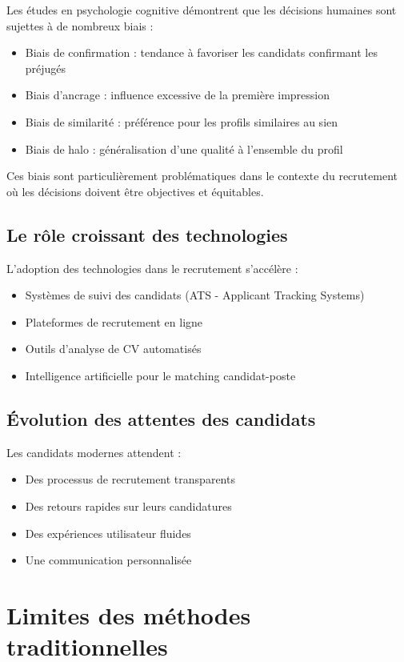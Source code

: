 \documentclass[12pt,a4paper]{report}
\begin{document}
Les études en psychologie cognitive démontrent que les décisions humaines sont sujettes à de nombreux biais :
\begin{itemize}
\item Biais de confirmation : tendance à favoriser les candidats confirmant les préjugés
\item Biais d'ancrage : influence excessive de la première impression
\item Biais de similarité : préférence pour les profils similaires au sien
\item Biais de halo : généralisation d'une qualité à l'ensemble du profil
\end{itemize}

Ces biais sont particulièrement problématiques dans le contexte du recrutement où les décisions doivent être objectives et équitables.

\subsection{Le rôle croissant des technologies}

L'adoption des technologies dans le recrutement s'accélère :
\begin{itemize}
\item Systèmes de suivi des candidats (ATS - Applicant Tracking Systems)
\item Plateformes de recrutement en ligne
\item Outils d'analyse de CV automatisés
\item Intelligence artificielle pour le matching candidat-poste
\end{itemize}

\subsection{Évolution des attentes des candidats}

Les candidats modernes attendent :
\begin{itemize}
\item Des processus de recrutement transparents
\item Des retours rapides sur leurs candidatures
\item Des expériences utilisateur fluides
\item Une communication personnalisée
\end{itemize}

\section{Limites des méthodes traditionnelles}
\end{document}
